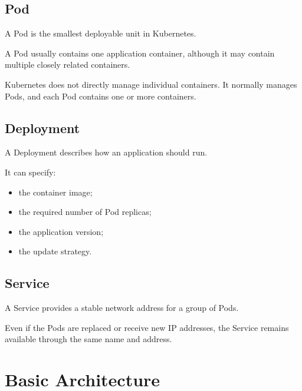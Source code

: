 \documentclass[a4paper]{article}
\begin{document}
        \subsection{Pod}
            
            A Pod is the smallest deployable unit in Kubernetes.
            
            A Pod usually contains one application container, although it may contain
            multiple closely related containers.
            
            \begin{tcolorbox}[
                enhanced,
                colback=yellow!8,
                colframe=yellow!50!black,
                title=Important
            ]
                Kubernetes does not directly manage individual containers. It normally manages
                Pods, and each Pod contains one or more containers.
            \end{tcolorbox}
        
        \subsection{Deployment}
            
            A Deployment describes how an application should run.
            
            It can specify:
            
            \begin{itemize}
                \item the container image;
                \item the required number of Pod replicas;
                \item the application version;
                \item the update strategy.
            \end{itemize}
        
        \subsection{Service}
            
            A Service provides a stable network address for a group of Pods.
            
            Even if the Pods are replaced or receive new IP addresses, the Service remains
            available through the same name and address.
    
    
    \section{Basic Architecture}
        
\end{document}
